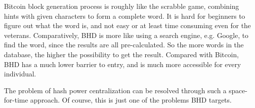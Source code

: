 \begin{flushleft}
    Bitcoin block generation process is roughly like the scrabble game, combining hints with given characters to form a complete word. It is hard for beginners to figure out what the word is, and not easy or at least time consuming even for the veterans. Comparatively, BHD is more like using a search engine, e.g. Google, to find the word, since the results are all pre-calculated. So the more words in the database, the higher the possibility to get the result. Compared with Bitcoin, BHD has a much lower barrier to entry, and is much more accessible for every individual.
\end{flushleft}
\begin{flushleft}
    The problem of hash power centralization can be resolved through such a space-for-time approach. Of course, this is just one of the problems BHD targets.
\end{flushleft}
